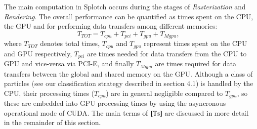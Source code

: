 \documentclass[1p]{elsarticle}
\begin{document}
The main computation in Splotch occurs during the stages of {\it Rasterization} and {\it Rendering}.
%
The overall performance can be quantified as times spent on the CPU, the GPU
and for performing data transfers among different memories:
\begin{equation}\label{Ts}
T_{TOT} = T_{cpu} + T_{pci} + T_{gpu} + T_{Mgpu},
\end{equation}
where $T_{TOT}$ denotes total times, 
$T_{cpu}$ and $T_{gpu}$ represent times spent on the CPU and GPU respectively, $T_{pci}$ are times needed for data transfers from the CPU to GPU and vice-versa via PCI-E, and finally $T_{Mgpu}$ are times required for data transfers between the global and shared memory on the GPU. Although a class of particles (see our classification strategy described in section 4.1) is handled by the CPU, their processing times ($T_{cpu}$) are in general negligible compared to $T_{gpu}$, so these are embedded into GPU processing times by using the asyncronous operational mode of CUDA. The main terms of $\eqref{Ts}$ are discussed in more detail in the remainder of this section.  
\end{document}
